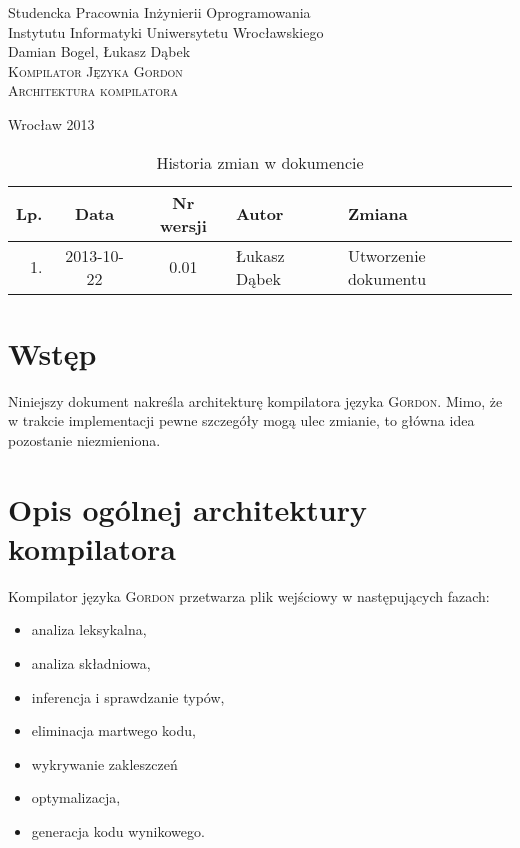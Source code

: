 \documentclass{documentation}
\begin{document}
\begin{titlepage}
\begin{center}
Studencka Pracownia Inżynierii Oprogramowania\\
Instytutu Informatyki Uniwersytetu Wrocławskiego\\[6cm]

Damian Bogel, Łukasz Dąbek\\[1cm]
\textsc{\LARGE Kompilator Języka Gordon}\\[0.5cm]
\textsc{\large Architektura kompilatora}

\vfill
Wrocław 2013 \\[2.5cm]

\end{center}
\end{titlepage}

\newpage
\begin{table}
	\centering
	\caption{Historia zmian w dokumencie}
		\begin{tabular}{|r|c|c|l|l|}
		\hline
		Lp.  & Data       & Nr wersji & Autor                 & Zmiana \\ \hline
		1.   & 2013-10-22 & 0.01 & Łukasz Dąbek & Utworzenie dokumentu \\ \hline
	\end{tabular}
\end{table}
\newpage

\tableofcontents
\setcounter{page}{2}

\newpage

\section{Wstęp}
\noindent Niniejszy dokument nakreśla architekturę kompilatora języka \textsc{Gordon}. Mimo, że
w trakcie implementacji pewne szczegóły mogą ulec zmianie, to główna idea pozostanie
niezmieniona.

\section{Opis ogólnej architektury kompilatora}
\noindent Kompilator języka \textsc{Gordon} przetwarza plik wejściowy w następujących fazach:
\begin{itemize}
    \item analiza leksykalna,
    \item analiza składniowa,
    \item inferencja i sprawdzanie typów,
    \item eliminacja martwego kodu,
    \item wykrywanie zakleszczeń
    \item optymalizacja,
    \item generacja kodu wynikowego.
\end{itemize}
\end{document}
